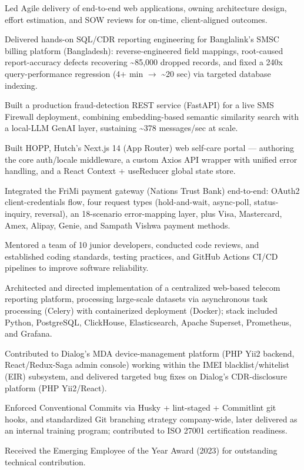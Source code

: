 \documentclass[10.5pt]{article}
\begin{document}
\begin{cvitems}
  \item Led Agile delivery of end-to-end web applications, owning architecture design, effort estimation, and SOW reviews for on-time, client-aligned outcomes.
  \item Delivered hands-on SQL/CDR reporting engineering for Banglalink's SMSC billing platform (Bangladesh): reverse-engineered field mappings, root-caused report-accuracy defects recovering \textasciitilde85,000 dropped records, and fixed a 240x query-performance regression (4+ min $\rightarrow$ \textasciitilde20 sec) via targeted database indexing.
  \item Built a production fraud-detection REST service (FastAPI) for a live SMS Firewall deployment, combining embedding-based semantic similarity search with a local-LLM GenAI layer, sustaining \textasciitilde378 messages/sec at scale.
  \item Built HOPP, Hutch's Next.js 14 (App Router) web self-care portal --- authoring the core auth/locale middleware, a custom Axios API wrapper with unified error handling, and a React Context + useReducer global state store.
  \item Integrated the FriMi payment gateway (Nations Trust Bank) end-to-end: OAuth2 client-credentials flow, four request types (hold-and-wait, async-poll, status-inquiry, reversal), an 18-scenario error-mapping layer, plus Visa, Mastercard, Amex, Alipay, Genie, and Sampath Vishwa payment methods.
  \item Mentored a team of 10 junior developers, conducted code reviews, and established coding standards, testing practices, and GitHub Actions CI/CD pipelines to improve software reliability.
\end{cvitems}

\begin{cvitems}
  \item Architected and directed implementation of a centralized web-based telecom reporting platform, processing large-scale datasets via asynchronous task processing (Celery) with containerized deployment (Docker); stack included Python, PostgreSQL, ClickHouse, Elasticsearch, Apache Superset, Prometheus, and Grafana.
  \item Contributed to Dialog's MDA device-management platform (PHP Yii2 backend, React/Redux-Saga admin console) working within the IMEI blacklist/whitelist (EIR) subsystem, and delivered targeted bug fixes on Dialog's CDR-disclosure platform (PHP Yii2/React).
  \item Enforced Conventional Commits via Husky + lint-staged + Commitlint git hooks, and standardized Git branching strategy company-wide, later delivered as an internal training program; contributed to ISO 27001 certification readiness.
  \item Received the Emerging Employee of the Year Award (2023) for outstanding technical contribution.
\end{cvitems}
\end{document}
